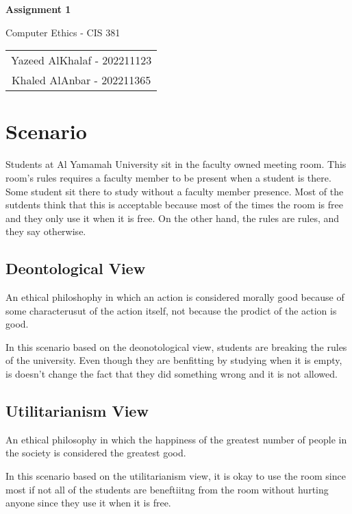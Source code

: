 \documentclass[12pt]{article}
\begin{document}
\begin{center}
    {\huge\textbf{Assignment 1}}
    \vspace{1em}
    
    {\large Computer Ethics - CIS 381}
    \vspace{2em}
    
    \begin{tabular}{c}
    Yazeed AlKhalaf - 202211123 \\
    Khaled AlAnbar - 202211365
    \end{tabular}
    \vspace{2em}
\end{center}

\section{Scenario}

Students at Al Yamamah University sit in the faculty owned meeting room. This room's rules requires a faculty member to be present when a student is there. Some student sit there to study without a faculty member presence. Most of the sutdents think that this is acceptable because most of the times the room is free and they only use it when it is free. On the other hand, the rules are rules, and they say otherwise.

\subsection{Deontological View}

\begin{mdframed}[style=rounded]
An ethical philoshophy in which an action is considered morally good because of some characterusut of the action itself, not because the prodict of the action is good.
\end{mdframed}

In this scenario based on the deonotological view, students are breaking the rules of the university. Even though they are benfitting by studying when it is empty, is doesn't change the fact that they did something wrong and it is not allowed.

\subsection{Utilitarianism View}

\begin{mdframed}[style=rounded]
    An ethical philosophy in which the happiness of the greatest number of people in the society is considered the greatest good.
\end{mdframed}

In this scenario based on the utilitarianism view, it is okay to use the room since most if not all of the students are beneftiitng from the room without hurting anyone since they use it when it is free.
\end{document}
